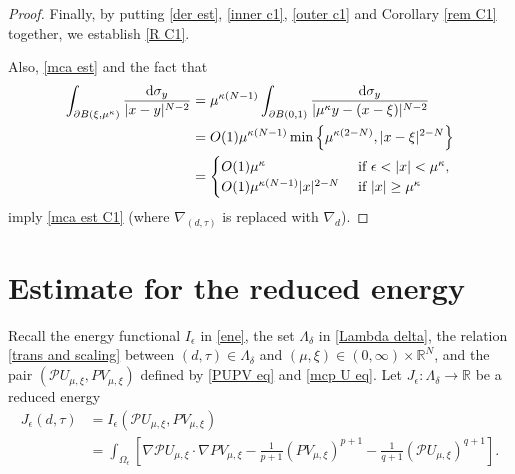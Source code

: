 \documentclass[reqno]{amsart}
\theoremstyle{remark}
\newcommand{\pa}{\partial}
\newcommand{\ep}{\epsilon}
\newcommand{\R}{\mathbb{R}}
\newcommand{\mcp}{\mathcal{P}}
\newcommand{\mx}{{\mu,\xi}}
\renewcommand{\(}{\left(}
\renewcommand{\)}{\right)}
\numberwithin{equation}{section}
\begin{document}
\begin{proof}
Finally, by putting \eqref{der est}, \eqref{inner c1}, \eqref{outer c1} and Corollary \ref{rem C1} together, we establish \eqref{R C1}.

\medskip
Also, \eqref{mca est} and the fact that
\begin{align*}
\int_{\pa B(\xi,\mu^\kappa)} \frac{\textup{d}\sigma_y}{|x-y|^{N-2} }
&=\mu^{\kappa(N-1)}\int_{\pa B(0,1)} \frac{\textup{d}\sigma_y}{|\mu^\kappa y-(x-\xi)|^{N-2}} \\
&=O(1)\mu^{\kappa(N-1)}\min\left\{\mu^{\kappa(2-N)},|x-\xi|^{2-N}\right\} \\
&=\begin{cases}
O(1) \mu^\kappa &\textup{ if } \ep< |x|<\mu^\kappa,\\
O(1)\mu^{\kappa(N-1)}|x|^{2-N} &\textup{ if }|x|\ge\mu^\kappa
\end{cases}
\end{align*}
imply \eqref{mca est C1} (where $\nabla_{(d,\tau)}$ is replaced with $\nabla_d$).
\end{proof}



\section{Estimate for the reduced energy}\label{sec red}
Recall the energy functional $I_\ep$ in \eqref{ene}, the set $\Lambda_\delta$ in \eqref{Lambda delta}, the relation \eqref{trans and scaling}
between $(d,\tau) \in \Lambda_\delta$ and $(\mu,\xi) \in (0,\infty) \times \R^N$, and the pair $(\mcp U_\mx,PV_\mx)$ defined by \eqref{PUPV eq} and \eqref{mcp U eq}.
Let $J_\ep:\Lambda_\delta \to \R$ be a reduced energy
\begin{equation}\label{red ene}
\begin{aligned}
J_\ep(d,\tau) &= I_\ep(\mcp U_\mx,PV_\mx) \\
&= \int_{\Omega_\ep} \left[\nabla \mcp U_\mx\cdot \nabla PV_\mx - \frac{1}{p+1}(PV_\mx)^{p+1} - \frac{1}{q+1}(\mcp U_\mx)^{q+1}\right].
\end{aligned}
\end{equation}
\end{document}

